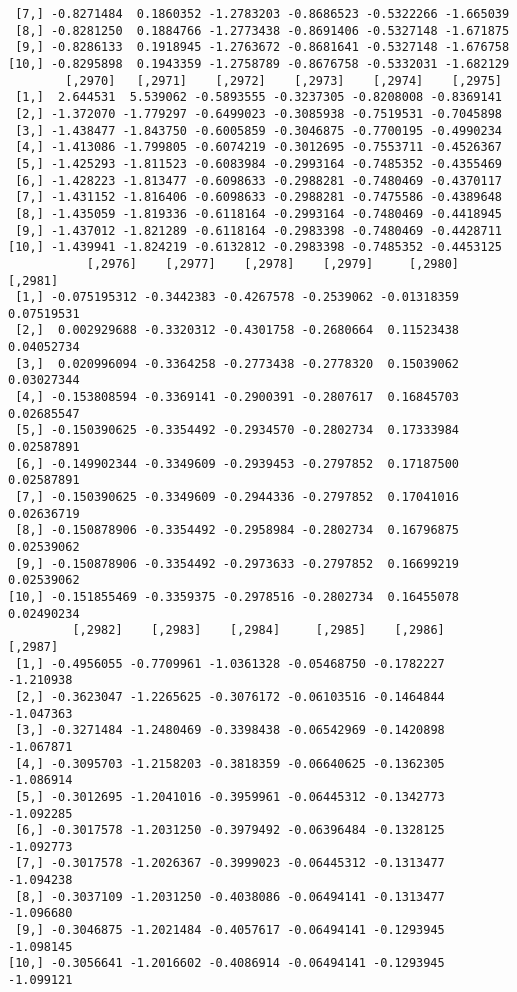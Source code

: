 \documentclass[
  letterpaper,
  DIV=11,
  numbers=noendperiod]{scrreprt}
\begin{document}
\begin{verbatim}
 [7,] -0.8271484  0.1860352 -1.2783203 -0.8686523 -0.5322266 -1.665039
 [8,] -0.8281250  0.1884766 -1.2773438 -0.8691406 -0.5327148 -1.671875
 [9,] -0.8286133  0.1918945 -1.2763672 -0.8681641 -0.5327148 -1.676758
[10,] -0.8295898  0.1943359 -1.2758789 -0.8676758 -0.5332031 -1.682129
        [,2970]   [,2971]    [,2972]    [,2973]    [,2974]    [,2975]
 [1,]  2.644531  5.539062 -0.5893555 -0.3237305 -0.8208008 -0.8369141
 [2,] -1.372070 -1.779297 -0.6499023 -0.3085938 -0.7519531 -0.7045898
 [3,] -1.438477 -1.843750 -0.6005859 -0.3046875 -0.7700195 -0.4990234
 [4,] -1.413086 -1.799805 -0.6074219 -0.3012695 -0.7553711 -0.4526367
 [5,] -1.425293 -1.811523 -0.6083984 -0.2993164 -0.7485352 -0.4355469
 [6,] -1.428223 -1.813477 -0.6098633 -0.2988281 -0.7480469 -0.4370117
 [7,] -1.431152 -1.816406 -0.6098633 -0.2988281 -0.7475586 -0.4389648
 [8,] -1.435059 -1.819336 -0.6118164 -0.2993164 -0.7480469 -0.4418945
 [9,] -1.437012 -1.821289 -0.6118164 -0.2983398 -0.7480469 -0.4428711
[10,] -1.439941 -1.824219 -0.6132812 -0.2983398 -0.7485352 -0.4453125
           [,2976]    [,2977]    [,2978]    [,2979]     [,2980]    [,2981]
 [1,] -0.075195312 -0.3442383 -0.4267578 -0.2539062 -0.01318359 0.07519531
 [2,]  0.002929688 -0.3320312 -0.4301758 -0.2680664  0.11523438 0.04052734
 [3,]  0.020996094 -0.3364258 -0.2773438 -0.2778320  0.15039062 0.03027344
 [4,] -0.153808594 -0.3369141 -0.2900391 -0.2807617  0.16845703 0.02685547
 [5,] -0.150390625 -0.3354492 -0.2934570 -0.2802734  0.17333984 0.02587891
 [6,] -0.149902344 -0.3349609 -0.2939453 -0.2797852  0.17187500 0.02587891
 [7,] -0.150390625 -0.3349609 -0.2944336 -0.2797852  0.17041016 0.02636719
 [8,] -0.150878906 -0.3354492 -0.2958984 -0.2802734  0.16796875 0.02539062
 [9,] -0.150878906 -0.3354492 -0.2973633 -0.2797852  0.16699219 0.02539062
[10,] -0.151855469 -0.3359375 -0.2978516 -0.2802734  0.16455078 0.02490234
         [,2982]    [,2983]    [,2984]     [,2985]    [,2986]   [,2987]
 [1,] -0.4956055 -0.7709961 -1.0361328 -0.05468750 -0.1782227 -1.210938
 [2,] -0.3623047 -1.2265625 -0.3076172 -0.06103516 -0.1464844 -1.047363
 [3,] -0.3271484 -1.2480469 -0.3398438 -0.06542969 -0.1420898 -1.067871
 [4,] -0.3095703 -1.2158203 -0.3818359 -0.06640625 -0.1362305 -1.086914
 [5,] -0.3012695 -1.2041016 -0.3959961 -0.06445312 -0.1342773 -1.092285
 [6,] -0.3017578 -1.2031250 -0.3979492 -0.06396484 -0.1328125 -1.092773
 [7,] -0.3017578 -1.2026367 -0.3999023 -0.06445312 -0.1313477 -1.094238
 [8,] -0.3037109 -1.2031250 -0.4038086 -0.06494141 -0.1313477 -1.096680
 [9,] -0.3046875 -1.2021484 -0.4057617 -0.06494141 -0.1293945 -1.098145
[10,] -0.3056641 -1.2016602 -0.4086914 -0.06494141 -0.1293945 -1.099121

\end{verbatim}
\end{document}
